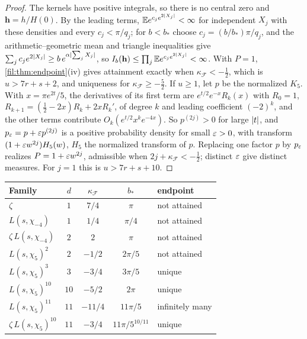 \begin{proof}
The kernels have positive integrals, so there is no central zero and $\mathbf h=h/H(0)$. By the leading terms,
$\mathbb Ee^{c_je^{2\lvert X_j\rvert}}<\infty$ for independent $X_j$ with these densities and every $c_j<\pi/q_j$; for
$b<b_*$ choose $c_j=(b/b_*)\pi/q_j$, and the arithmetic--geometric mean and triangle inequalities give
$\sum_jc_je^{2\lvert X_j\rvert}\ge b\,e^{\alpha\lvert\sum_jX_j\rvert}$, so $I_b(\mathbf h)\le\prod_j\mathbb Ee^{c_je^{2\lvert X_j\rvert}}<\infty$. With
$P=1$, \cref{fil:thm:endpoint}(iv) gives attainment exactly when $\kappa_{\mathcal F}<-\tfrac12$, which is $u>7r+s+2$,
and uniqueness for $\kappa_{\mathcal F}\ge-\tfrac52$. If $u\ge1$, let $p$ be the normalized $K_5$. With $x=\pi e^{2t}/5$, the
derivatives of its first term are $e^{t/2}e^{-x}R_k(x)$ with $R_0=1$, $R_{k+1}=(\tfrac12-2x)R_k+2xR_k'$, of degree $k$ and
leading coefficient $(-2)^k$, and the other terms contribute $O_k(e^{t/2}x^ke^{-4x})$. So $p^{(2j)}>0$ for large
$\lvert t\rvert$, and $p_\varepsilon=p+\varepsilon p^{(2j)}$ is a positive probability density for small $\varepsilon>0$, with transform
$(1+\varepsilon w^{2j})H_5(w)$, $H_5$ the normalized transform of $p$. Replacing one factor $p$ by $p_\varepsilon$ realizes
$P=1+\varepsilon w^{2j}$, admissible when $2j+\kappa_{\mathcal F}<-\tfrac12$; distinct $\varepsilon$ give distinct measures. For $j=1$ this
is $u>7r+s+10$.
\end{proof}

\begin{center}
\small
\begin{tabular}{@{}lcccl@{}}
\toprule
Family & $d$ & $\kappa_{\mathcal F}$ & $b_*$ & endpoint\\
\midrule
$\zeta$ & $1$ & $7/4$ & $\pi$ & not attained\\
$L(s,\chi_{-4})$ & $1$ & $1/4$ & $\pi/4$ & not attained\\
$\zeta\,L(s,\chi_{-4})$ & $2$ & $2$ & $\pi$ & not attained\\
$L(s,\chi_5)^2$ & $2$ & $-1/2$ & $2\pi/5$ & not attained\\
$L(s,\chi_5)^3$ & $3$ & $-3/4$ & $3\pi/5$ & unique\\
$L(s,\chi_5)^{10}$ & $10$ & $-5/2$ & $2\pi$ & unique\\
$L(s,\chi_5)^{11}$ & $11$ & $-11/4$ & $11\pi/5$ & infinitely many\\
$\zeta\,L(s,\chi_5)^{10}$ & $11$ & $-3/4$ & $11\pi/5^{10/11}$ & unique\\
\bottomrule
\end{tabular}
\end{center}

